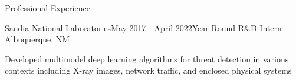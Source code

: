 \documentclass[11pt]{resume} %
\begin{document}
\begin{rSection}{Professional Experience}
\begin{rSubsection}{Sandia National Laboratories}{May 2017 - April 2022}{Year-Round R\&D Intern - Albuquerque, NM}
    \setlength\itemsep{0em}
    \item Developed multimodel deep learning algorithms for threat detection in various contexts including X-ray images,
    network traffic, and enclosed physical systems

\end{rSubsection}
\end{rSection}

\end{document}
